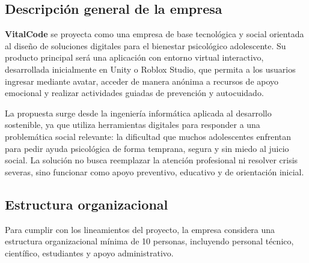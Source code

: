 \documentclass[12pt,letterpaper]{article}
\begin{document}
\subsection{Descripción general de la empresa}
\textbf{VitalCode} se proyecta como una empresa de base tecnológica y social orientada al diseño de soluciones digitales para el bienestar psicológico adolescente. Su producto principal será una aplicación con entorno virtual interactivo, desarrollada inicialmente en Unity o Roblox Studio, que permita a los usuarios ingresar mediante avatar, acceder de manera anónima a recursos de apoyo emocional y realizar actividades guiadas de prevención y autocuidado.

La propuesta surge desde la ingeniería informática aplicada al desarrollo sostenible, ya que utiliza herramientas digitales para responder a una problemática social relevante: la dificultad que muchos adolescentes enfrentan para pedir ayuda psicológica de forma temprana, segura y sin miedo al juicio social. La solución no busca reemplazar la atención profesional ni resolver crisis severas, sino funcionar como apoyo preventivo, educativo y de orientación inicial.

\subsection{Estructura organizacional}
Para cumplir con los lineamientos del proyecto, la empresa considera una estructura organizacional mínima de 10 personas, incluyendo personal técnico, científico, estudiantes y apoyo administrativo.
\end{document}
